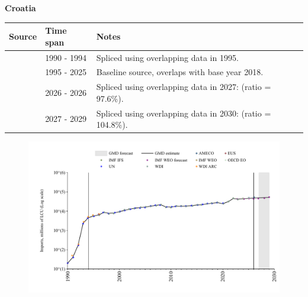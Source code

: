\documentclass[12pt,a4paper,landscape]{article}
\begin{document}
\begin{adjustbox}{max totalsize={\paperwidth}{\paperheight},center}
\begin{minipage}[t][\textheight][t]{\textwidth}
\vspace*{0.5cm}
{}
\begin{center}
{\Large\bfseries Croatia}
\end{center}
\vspace{0.5cm}
\begin{table}[H]
\centering
\small
\begin{tabular}{|l|l|l|}
\hline
\textbf{Source} & \textbf{Time span} & \textbf{Notes} \\
\hline
\rowcolor{white}\cite{UN}& 1990 - 1994 &Spliced using overlapping data in 1995.\\
\rowcolor{lightgray}\cite{OECD_EO}& 1995 - 2025 &Baseline source, overlaps with base year 2018.\\
\rowcolor{white}\cite{AMECO}& 2026 - 2026 &Spliced using overlapping data in 2027: (ratio = 97.6\%).\\
\rowcolor{lightgray}\cite{IMF_WEO_forecast}& 2027 - 2029 &Spliced using overlapping data in 2030: (ratio = 104.8\%).\\
\hline
\end{tabular}
\end{table}
\begin{figure}[H]
\centering
\includegraphics[width=\textwidth,height=0.6\textheight,keepaspectratio]{graphs/HRV_imports.pdf}
\end{figure}
\end{minipage}
\end{adjustbox}
\end{document}

